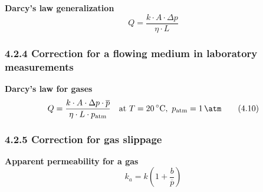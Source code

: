 \textbf{Darcy's law generalization}
\begin{equation*}
    Q = \frac{k\cdot A\cdot\Delta p}{\eta\cdot L}\tag{4.9}
\end{equation*}

\subsubsection{4.2.4 Correction for a flowing medium in laboratory measurements}
\textbf{Darcy's law for gases}
\begin{equation*}
    Q = \frac{k\cdot A\cdot \Delta p\cdot\overline{p}}{\eta\cdot L\cdot p_\mathrm{atm}}\quad \mathrm{at}\ T=\SI{20}{\celsius},\ p_\mathrm{atm}=\SI{1}{\atm}\tag{4.10}
\end{equation*}

\subsubsection{4.2.5 Correction for gas slippage}
\textbf{Apparent permeability for a gas}
\begin{equation*}
    k_a = k\left(1 + \frac{b}{\overline{p}}\right)\tag{4.11}
\end{equation*}

